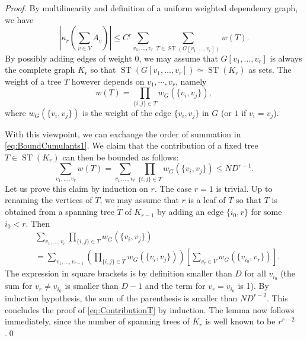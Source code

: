 \documentclass[envcountsame]{svmult}
\def\WDep{G}
\def\ka{\kappa}
\DeclareMathOperator{\ST}{ST}
\begin{document}
\begin{proof}
  By multilinearity and definition of a uniform weighted dependency graph,
  we have
  \begin{equation}
    \left| \ka_r\left( \sum_{v \in V} A_v \right) \right|
  \le C^r \sum_{v_1,\ldots,v_r} \sum_{T \in \ST(\WDep[v_1,\ldots,v_r])} w(T). 
  \label{eq:BoundCumulants1}
\end{equation}
  By possibly adding edges of weight $0$, we may assume that $\WDep[v_1,\ldots,v_r]$
  is always the complete graph $K_r$ so that $\ST(\WDep[v_1,\ldots,v_r]) \simeq \ST(K_r)$ as sets.
  The weight of a tree $T$ however depends on $v_1,\cdots,v_r$, namely
  \[w(T)=\prod_{\{i,j\} \in T} w_\WDep(\{v_i,v_j\}),\]
  where $w_\WDep(\{v_i,v_j\})$ is the weight of the edge $\{v_i,v_j\}$ in $\WDep$ 
  (or $1$ if $v_i=v_j$). \medskip
  
  With this viewpoint, we can exchange the order of summation in \eqref{eq:BoundCumulants1}.
  We claim that the contribution of a fixed tree $T \in \ST(K_r)$ can then be bounded as follows:
  \begin{equation}
    \sum_{v_1,\ldots,v_r} w(T) = \sum_{v_1,\ldots,v_r} \prod_{\{i,j\} \in T} w_\WDep(\{v_i,v_j\}) \leq N D^{r-1}.
    \label{eq:ContributionT}
  \end{equation}
  Let us prove this claim by induction on $r$. The case $r=1$ is trivial.
  Up to renaming the vertices of $T$, we may assume that $r$ is a leaf of $T$ so that $T$
  is obtained from a spanning tree $\widetilde{T}$ of $K_{r-1}$ by adding an edge $\{i_0,r\}$ for some $i_0<r$.
  Then
  \begin{align*}
  &\sum_{v_1,\ldots,v_r} \prod_{\{i,j\} \in T} w_\WDep(\{v_i,v_j\})\\
  &= \sum_{v_1,\ldots,v_{r-1}} \left( \prod_{\{i,j\} \in \widetilde{T}} w_\WDep(\{v_i,v_j\}) 
  \right) \left[\sum_{v_r \in V}  w_\WDep(\{v_{i_0},v_r\}) \right].
  \end{align*}
  The expression in square brackets is by definition smaller than $D$ for all $v_{i_0}$
  (the sum for $v_r \ne v_{i_0}$ is smaller than $D-1$ and the term for $v_r = v_{i_0}$ is 1).
  By induction hypothesis, the sum of the parenthesis is smaller than $N D^{r-2}$.
  This concludes the proof of \eqref{eq:ContributionT} by induction. The lemma now follows immediately, since the number of spanning trees of $K_r$ is well known
  to be $r^{r-2}$.\qed
\end{proof}
\end{document}
